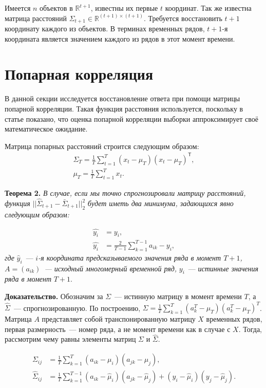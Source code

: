 \documentclass{article}
\begin{document}
Имеется $n$ объектов в $\mathbb{R}^{t+1}$, известны их первые $t$ координат. Так же известна матрица расстояний $\Sigma_{t+1} \in \mathbb{R}^{(t+1) \times (t+1)}$. Требуется восстановить $t+1$ координату каждого из объектов. В терминах временных рядов, $t+1$-я координата является значением каждого из рядов в этот момент времени.

\section{Попарная корреляция}

В данной секции исследуется восстановление ответа при помощи матрицы попарной корреляции. Такая функция расстояния используется, поскольку в статье \cite{puchkin2023sharper} показано, что оценка попарной корреляции выборки аппроксимирует своё математическое ожидание.

Матрица попарных расстояний строится следующим образом:
\begin{gather*}
	{\Sigma}_T = \frac{1}{T} \sum_{t=1}^{T} (x_t - \mu_T)(x_t - \mu_T)^\mathsf{T},\\
	\mu_T = \frac{1}{T} \sum_{t=1}^{T} x_t.
\end{gather*}

\textbf{Теорема 2.} \textit{В случае, если мы точно спрогнозировали матрицу расстояний, функция} $||\hat{\Sigma}_{t+1} - \bar{\Sigma}_{t+1}||_2^2$ \textit{будет иметь два минимума, задающихся явно следующим образом:}

\begin{align*}
	\hat{y_i} &= y_i,\\
	\hat{y_i} &= \frac{2}{T-1} \sum_{k=1}^{T-1} a_{ik} - y_i,
\end{align*}
\textit{где} $\hat{y}_i$~--- $i$\textit{-я координата предсказываемого значения ряда в момент $T+1$, $A=(a_{ik})$~--- исходный многомерный временной ряд,} $y_i$~--- \textit{истинные значения ряда в момент} $T+1$.

\textbf{Доказательство.} Обозначим за $\Sigma$~--- истинную матрицу в момент времени $T$, а $\hat{\Sigma}$~--- спрогнозированную. По построению, ${\Sigma} = \frac{1}{T} \sum_{k=1}^{T} (a^T_k - \mu_T)(a^T_k - \mu_T)^T$. Матрица $A$ представляет собой транспонированную матрицу $X$ временных рядов, первая размерность~--- номер ряда, а не момент времени как в случае с $X$. Тогда, рассмотрим чему равны элементы матриц $\Sigma$ и $\hat{\Sigma}$.

\begin{align*}
	\Sigma_{ij} &= \frac{1}{T}\sum_{k=1}^{T}(a_{ik} - \mu_i)(a_{jk}-\mu_j),\\
	\hat{\Sigma}_{ij} &= \frac{1}{T}\sum_{k=1}^{T-1}(a_{ik} - \hat{\mu}_i)(a_{jk}-\hat{\mu}_j) + (y_i - \hat{\mu}_i)(y_j - \hat{\mu}_j).
\end{align*}
\end{document}
